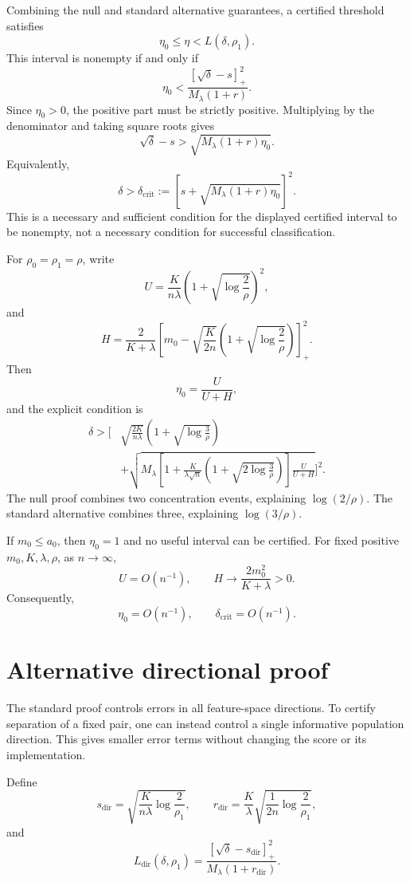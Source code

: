 \documentclass[11pt]{article}
\begin{document}
Combining the null and standard alternative guarantees,
a certified threshold satisfies
\[
\boxed{
\eta_0\le\eta<L(\delta,\rho_1).
}
\]
This interval is nonempty if and only if
\[
\eta_0<
\frac{[\sqrt\delta-s]_+^2}
{M_\lambda(1+r)}.
\]
Since $\eta_0>0$, the positive part must be strictly positive.
Multiplying by the denominator and taking square roots gives
\[
\sqrt\delta-s
>
\sqrt{M_\lambda(1+r)\eta_0}.
\]
Equivalently,
\begin{equation}
\boxed{
\delta>
\delta_{\mathrm{crit}}
:=
\left[
s
+\sqrt{M_\lambda(1+r)\eta_0}
\right]^2.
}
\label{eq:critical-standard}
\end{equation}
This is a necessary and sufficient condition for the
displayed certified interval to be nonempty, not a necessary
condition for successful classification.

For $\rho_0=\rho_1=\rho$, write
\[
U=\frac K{n\lambda}
\left(1+\sqrt{\log\frac2\rho}\right)^2,
\]
and
\[
H=\frac2{K+\lambda}
\left[
m_0-\sqrt{\frac K{2n}}
\left(1+\sqrt{\log\frac2\rho}\right)
\right]_+^2.
\]
Then
\[
\eta_0=\frac{U}{U+H},
\]
and the explicit condition is
\[
\boxed{
\begin{aligned}
\delta>
\Bigg[
&\sqrt{\frac{2K}{n\lambda}}
\left(1+\sqrt{\log\frac3\rho}\right)
\\
&+
\sqrt{
M_\lambda
\left[
1+\frac K{\lambda\sqrt n}
\left(1+\sqrt{2\log\frac3\rho}\right)
\right]
\frac{U}{U+H}
}
\Bigg]^2.
\end{aligned}
}
\]
The null proof combines two concentration events, explaining
$\log(2/\rho)$. The standard alternative combines three,
explaining $\log(3/\rho)$.

If $m_0\le a_0$, then $\eta_0=1$ and no useful interval
can be certified. For fixed positive $m_0,K,\lambda,\rho$,
as $n\to\infty$,
\[
U=O(n^{-1}),
\qquad
H\longrightarrow\frac{2m_0^2}{K+\lambda}>0.
\]
Consequently,
\[
\eta_0=O(n^{-1}),
\qquad
\delta_{\mathrm{crit}}=O(n^{-1}).
\]

\appendix

\section{Alternative directional proof}

The standard proof controls errors in all feature-space
directions. To certify separation of a fixed pair, one can
instead control a single informative population direction.
This gives smaller error terms without changing the score
or its implementation.

Define
\[
s_{\mathrm{dir}}
=\sqrt{\frac K{n\lambda}\log\frac2{\rho_1}},
\qquad
r_{\mathrm{dir}}
=\frac K\lambda
\sqrt{\frac1{2n}\log\frac2{\rho_1}},
\]
and
\begin{equation}
L_{\mathrm{dir}}(\delta,\rho_1)
=
\frac{[\sqrt\delta-s_{\mathrm{dir}}]_+^2}
{M_\lambda(1+r_{\mathrm{dir}})}.
\label{eq:Ldir}
\end{equation}
\end{document}

